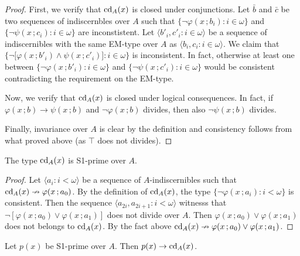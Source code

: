 \documentclass[10pt,oneside]{amsproc}
\begin{document}
\begin{proof}
  First, we verify that ${\rm cd}_A(x)$ is closed under conjunctions.
  Let $\bar b$ and $\bar c$ be two sequences of indiscernbles over $A$ such that $\big\{\neg\varphi(x\,;b_i):i\in\omega\big\}$ and $\big\{\neg\psi(x\,;c_i):i\in\omega\big\}$ are inconstistent.
  Let  $\langle b'_i,c'_i:i\in\omega\rangle$ be a sequence of indiscernibles with the same EM-type over $A$ as $\langle b_i,c_i:i\in\omega\rangle$.
  We claim that $\big\{\neg\big[\varphi(x\,;b'_i)\wedge\psi(x\,;c'_i)\big]:i\in\omega\big\}$ is inconsistent.
  In fact, otherwise at least one between $\big\{\neg\varphi(x\,;b'_i):i\in\omega\big\}$ and $\big\{\neg\psi(x\,;c'_i):i\in\omega\big\}$ would be consistent contradicting the requirement on the EM-type.

  Now, we verify that ${\rm cd}_A(x)$ is closed under logical consequences.
  In fact, if $\varphi(x\,;b)\rightarrow\psi(x\,;b)$ and $\neg\varphi(x\,;b)$ divides, then also $\neg\psi(x\,;b)$ divides.

  Finally, invariance over $A$ is clear by the definition and consistency follows from what proved above (as $\top$ does not divides).
\end{proof}

\begin{lemma} 
  The type ${\rm cd}_A(x)$ is S1-prime over $A$.
\end{lemma}

\begin{proof}
  Let $\langle a_i:i<\omega\rangle$ be a sequence of $A$-indiscernibles such that ${\rm cd}_A(x)\nrightarrow\varphi(x\,;a_0)$.
  By the definition of ${\rm cd}_A(x)$, the type $\big\{\neg\varphi(x\,;a_i):i<\omega\big\}$ is consistent.
  Then the sequence  $\langle a_{2i},a_{2i+1}:i<\omega\rangle$ witnesss that $\neg[\varphi(x\,;a_0)\vee\varphi(x\,;a_1)]$ does not divide over $A$.
  Then $\varphi(x\,;a_0)\vee\varphi(x\,;a_1)$ does not belongs to ${\rm cd}_A(x)$.
  By the fact above ${\rm cd}_A(x)\nrightarrow\varphi(x\,;a_0)\vee\varphi(x\,;a_1)$.
\end{proof}


\begin{lemma} 
  Let $p(x)$ be S1-prime over $A$.
  Then $p(x)\rightarrow{\rm cd}_A(x)$.
\end{lemma}
\end{document}
